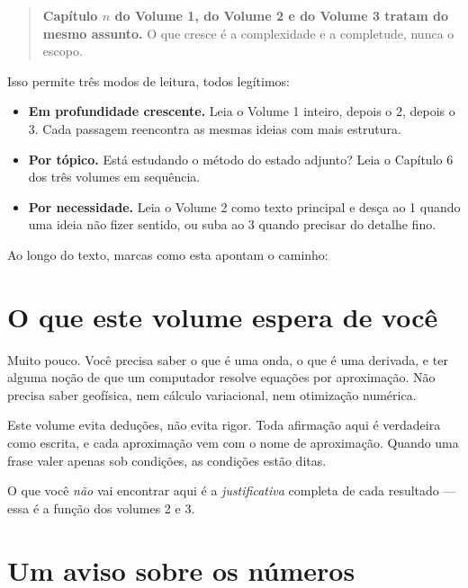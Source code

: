 \documentclass[11pt,a4paper,oneside]{report}
\begin{document}
\begin{quote}
\textbf{Cap\'itulo $n$ do Volume 1, do Volume 2 e do Volume 3 tratam do mesmo
assunto.} O que cresce \'e a complexidade e a completude, nunca o escopo.
\end{quote}

Isso permite tr\^es modos de leitura, todos leg\'itimos:

\begin{itemize}[leftmargin=*]
\item \textbf{Em profundidade crescente.} Leia o Volume 1 inteiro, depois o 2,
depois o 3. Cada passagem reencontra as mesmas ideias com mais estrutura.
\item \textbf{Por t\'opico.} Est\'a estudando o m\'etodo do estado adjunto?
Leia o Cap\'itulo 6 dos tr\^es volumes em sequ\^encia.
\item \textbf{Por necessidade.} Leia o Volume 2 como texto principal e des\c{c}a
ao 1 quando uma ideia n\~ao fizer sentido, ou suba ao 3 quando precisar do
detalhe fino.
\end{itemize}

Ao longo do texto, marcas como esta apontam o caminho:


\section*{O que este volume espera de voc\^e}

Muito pouco. Voc\^e precisa saber o que \'e uma onda, o que \'e uma derivada,
e ter alguma no\c{c}\~ao de que um computador resolve equa\c{c}\~oes por
aproxima\c{c}\~ao. N\~ao precisa saber geof\'isica, nem c\'alculo variacional,
nem otimiza\c{c}\~ao num\'erica.

\begin{atencao}
Este volume evita dedu\c{c}\~oes, n\~ao evita rigor. Toda afirma\c{c}\~ao
aqui \'e verdadeira como escrita, e cada aproxima\c{c}\~ao vem com o nome de
aproxima\c{c}\~ao. Quando uma frase valer apenas sob condi\c{c}\~oes, as
condi\c{c}\~oes est\~ao ditas.

O que voc\^e \emph{n\~ao} vai encontrar aqui \'e a \emph{justificativa}
completa de cada resultado --- essa \'e a fun\c{c}\~ao dos volumes 2 e 3.
\end{atencao}

\section*{Um aviso sobre os n\'umeros}
\end{document}
